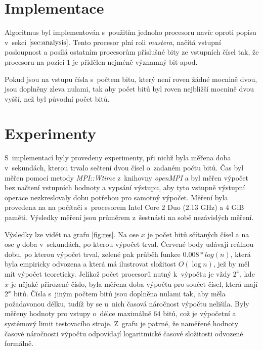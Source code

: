 \documentclass[a4paper, 12pt]{article}
\begin{document}
\section{Implementace}
\label{sec:impl}
Algoritmus byl implementován s~použitím jednoho procesoru navíc oproti popisu v~sekci $\ref{sec:analysis}$.
Tento procesor plní roli \emph{mastera}, načítá vstupní posloupnost a posílá ostatním procesorům příslušné bity
ze vstupních čísel tak, že procesoru na pozici $1$ je přidělen nejméně významný bit apod.

Pokud jsou na vstupu čísla s~počtem bitu, který není roven žádné mocnině dvou, jsou doplněny zleva nulami,
tak aby počet bitů byl roven nejbližší mocnině dvou vyšší, než byl původní počet bitů.

\section{Experimenty}
\label{sec:exprmts}
S~implementací byly provedeny experimenty, při nichž byla měřena doba v~sekundách, kterou
trvalo sečtení dvou čísel o~zadaném počtu bitů.
Čas byl měřen pomocí metody \emph{MPI::Wtime} z~knihovny \emph{openMPI}
a byl měřen výpočet bez načtení vstupních hodnoty a vypsání výstupu,
aby tyto vstupně výstupní operace nezkreslovaly dobu potřebou pro samotný výpočet.
Měření byla provedena na na počítači s~procesorem Intel Core 2 Duo (2.13 GHz) a 4 GiB paměti.
Výsledky měření jsou průměrem z~šestnásti na sobě nezávislých měření.

Výsledky lze vidět na grafu \ref{fig:res}.
Na ose $x$ je počet bitů sčítaných čísel a na ose $y$ doba v~sekundách,
po kterou výpočet trval.
Červené body udávají reálnou dobu, po kterou výpočet trval, zelené
pak průběh funkce $0.008*log(n)$, která byla empiricky odvozena
a která má ilustrovat složitost $O(\log{n})$, jež by měl mít výpočet teoreticky.
Jelikož počet procesorů nutný k~výpočtu je vždy $2^x$, kde $x$ je nějaké přirozené číslo,
byla měřena doba výpočtu pro součet čísel, která mají $2^x$ bitů.
Čísla s~jiným počtem bitů jsou doplněna nulami tak, aby měla požadavonou délku, tudíž
by se u~nich časová náročnost výpočtu nelišila.
Byly měřeny hodnoty pro vstupy o~délce maximálně $64$ bitů, což je výpočetní a systémový limit testovacího
stroje.
Z~grafu je patrné, že naměřené hodnoty časové náročnosti výpočtu odpovídají logaritmické
časové složitosti odvozené formálně.
\end{document}
